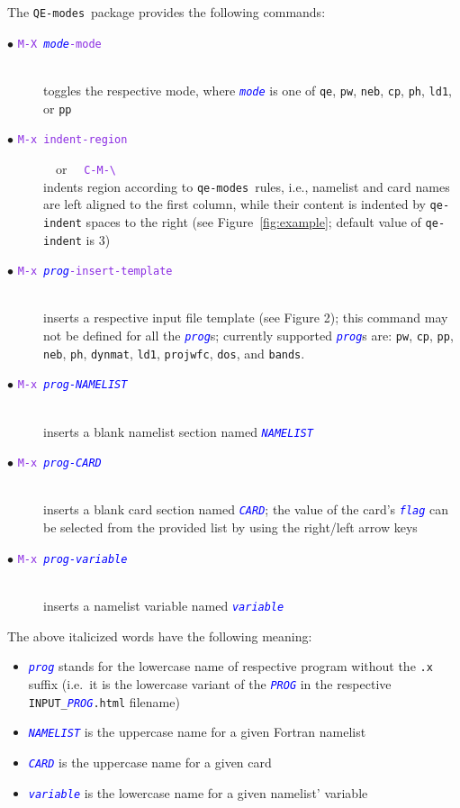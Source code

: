 \documentclass[12pt,a4paper]{article}
\def\QEmodes{\texttt{QE-modes}}
\def\qemodes{\texttt{qe-modes}}
\def\efn#1{\textcolor{BlueViolet}{\texttt{#1}}}
\def\var#1{\textcolor{Blue}{\texttt{\textit{#1}}}}
\begin{document}
The \QEmodes\ package provides the following commands:
\begin{description}
\item[$\bullet$ \efn{M-X \var{mode}-mode}]\hfill\\ toggles
  the respective mode, where \var{mode} is one of \texttt{qe},
  \texttt{pw}, \texttt{neb}, \texttt{cp}, \texttt{ph}, \texttt{ld1}, or \texttt{pp}

\item[$\bullet$ \efn{M-x indent-region}] ~~{\rm or}~~ \efn{C-M-\textbackslash}\hfill\\
  indents region according to \qemodes\ rules, i.e., namelist and card
  names are left aligned to the first column, while their content is
  indented by \texttt{qe-indent} spaces to the right (see
  Figure~\ref{fig:example}; default value of \texttt{qe-indent} is 3)

\item[$\bullet$ \efn{M-x \var{prog}-insert-template}]\hfill\\
  inserts a respective input file template (see Figure 2); this
  command may not be defined for all the \var{prog}s; currently
  supported \var{prog}s are: \texttt{pw}, \texttt{cp}, \texttt{pp},
  \texttt{neb}, \texttt{ph}, \texttt{dynmat}, \texttt{ld1},
  \texttt{projwfc}, \texttt{dos}, and \texttt{bands}.

\item[$\bullet$ \efn{M-x \var{prog-NAMELIST}}]\hfill\\ 
  inserts a blank namelist section named \var{NAMELIST}

\item[$\bullet$ \efn{M-x \var{prog-CARD}}]\hfill\\
  inserts a blank card section named \var{CARD}; the value of the
  card's \var{flag} can be selected from the provided list by using
  the right/left arrow keys

\item[$\bullet$ \efn{M-x \var{prog-variable}}]\hfill\\
  inserts a namelist variable named \var{variable}

\end{description}
The above italicized words have the following meaning:
\begin{itemize}
\item \var{prog} stands for the lowercase name of respective program
  without the \texttt{.x} suffix (i.e.\ it is the lowercase variant of
  the \var{PROG} in the respective \texttt{INPUT\_\var{PROG}.html}
  filename)
\item \var{NAMELIST} is the uppercase name for a given Fortran namelist
\item \var{CARD} is the uppercase name for a given card
\item \var{variable} is the lowercase name for a given namelist' variable
\end{itemize}
\end{document}
